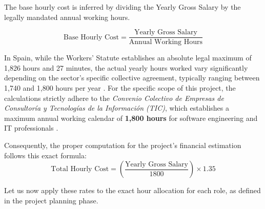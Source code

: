 The base hourly cost is inferred by dividing the Yearly Gross Salary by the legally mandated annual working hours.

\begin{equation}
    \text{Base Hourly Cost} = \frac{\text{Yearly Gross Salary}}{\text{Annual Working Hours}}
\end{equation}

In Spain, while the Workers' Statute establishes an absolute legal maximum of 1,826 hours and 27 minutes, the actual yearly hours worked vary significantly depending on the sector's specific collective agreement, typically ranging between 1,740 and 1,800 hours per year \cite{estatuto_trabajadores}. For the specific scope of this project, the calculations strictly adhere to the \textit{Convenio Colectivo de Empresas de Consultoría y Tecnologías de la Información (TIC)}, which establishes a maximum annual working calendar of \textbf{1,800 hours} for software engineering and IT professionals \cite{convenio_tic_2023}. 

Consequently, the proper computation for the project's financial estimation follows this exact formula:
\begin{equation}
    \text{Total Hourly Cost} = \left( \frac{\text{Yearly Gross Salary}}{1800} \right) \times 1.35
\end{equation}


Let us now apply these rates to the exact hour allocation for each role, as defined in the project planning phase.

